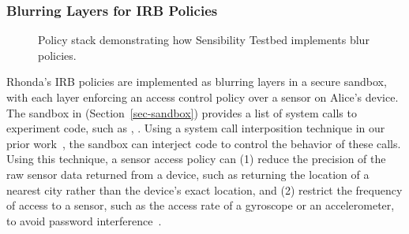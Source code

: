 \subsubsection{Blurring Layers for IRB Policies}\label{sec-bob-policy}

\begin{figure}
\caption{\small Policy stack demonstrating how Sensibility Testbed implements blur policies.
\label{fig-blur}}
\end{figure}

Rhonda's IRB policies are implemented as blurring layers in a secure sandbox, with 
each layer enforcing an access control policy over a sensor on Alice's device. 
The sandbox in \sysname (Section~\ref{sec-sandbox}) provides a list of system 
calls to experiment code, such as , . 
Using a system call interposition technique in our prior work~\cite{cappos2010retaining}, 
the sandbox can interject code to control the behavior of these calls. Using this 
technique, a sensor access policy can (1) reduce the precision of the raw sensor data 
returned from a device, such as returning the location of a nearest city rather than the 
device's exact location, and (2) restrict the frequency of access to a sensor, such as the 
access rate of a gyroscope or an accelerometer, to avoid password 
interference~\cite{michalevsky2014gyrophone}.



